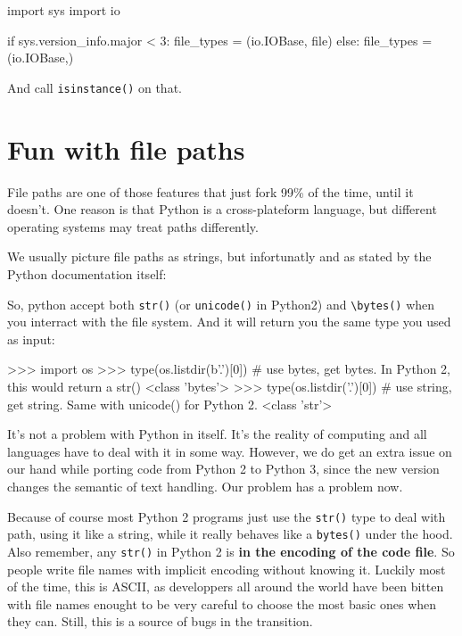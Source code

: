 \begin{py2and3}
import sys
import io

if sys.version_info.major < 3:
    file_types = (io.IOBase, file)
else:
    file_types = (io.IOBase,)
\end{py2and3}

And call \lstinline{isinstance()} on that.

\section{Fun with file paths}

File paths are one of those features that just fork 99\% of the time, until it doesn't. One reason is that Python is a cross-plateform language, but different operating systems may treat paths differently.

We usually picture file paths as strings, but infortunatly and as stated by the Python documentation itself: 

So, python accept both \lstinline{str()} (or \lstinline{unicode()} in Python2) and \lstinline{\bytes()} when you interract with the file system. And it will return you the same type you used as input:

\begin{py3}
>>> import os
>>> type(os.listdir(b'.')[0]) # use bytes, get bytes. In Python 2, this would return a str()
<class 'bytes'>
>>> type(os.listdir('.')[0]) # use string, get string. Same with unicode() for Python 2.
<class 'str'>
\end{py3}

It's not a problem with Python in itself. It's the reality of computing and all languages have to deal with it in some way.  However, we do get an extra issue on our hand while porting code from Python 2 to Python 3, since the new version changes the semantic of text handling. Our problem has a problem now.

Because of course most Python 2 programs just use the \lstinline{str()} type to deal with path, using it like a string, while it really behaves like a \lstinline{bytes()} under the hood. Also remember, any \lstinline{str()} in Python 2 is \textbf{in the encoding of the code file}. So people write file names with implicit encoding without knowing it. Luckily most of the time, this is ASCII, as developpers all around the world have been bitten with file names enought to be very careful to choose the most basic ones when they can. Still, this is a source of bugs in the transition.

